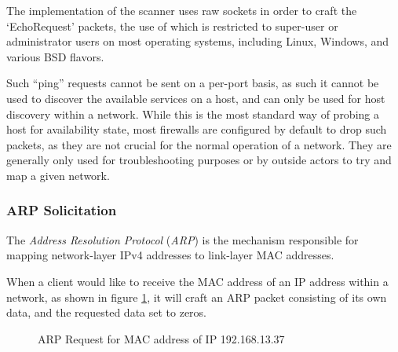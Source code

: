 \documentclass[a4paper,12pt]{article}
\begin{document}
	The implementation of the scanner uses raw sockets in order to craft the `EchoRequest' packets, the use of which is restricted to super-user or administrator users on most operating systems, including Linux, Windows, and various BSD flavors.

	Such ``ping'' requests cannot be sent on a per-port basis, as such it cannot be used to discover the available services on a host, and can only be used for host discovery within a network. While this is the most standard way of probing a host for availability state, most firewalls are configured by default to drop such packets, as they are not crucial for the normal operation of a network. They are generally only used for troubleshooting purposes or by outside actors to try and map a given network.

\subsubsection{ARP Solicitation} \label{arpping}
 

	The \textit{Address Resolution Protocol} (\textit{ARP}) is the mechanism responsible for mapping network-layer IPv4 addresses to link-layer MAC addresses.
	
	When a client would like to receive the MAC address of an IP address within a network, as shown in figure \ref{arpreq}, it will craft an ARP packet consisting of its own data, and the requested data set to zeros.

	\begin{figure}[!htbp]
		\centering
		\caption{ARP Request for MAC address of IP 192.168.13.37}
		\label{arpreq}
	\end{figure}
	
\end{document}
